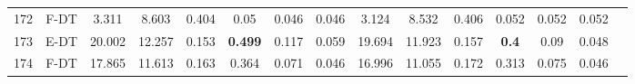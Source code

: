\begin{longtable}{@{\hskip3pt}c@{\hskip3pt}c@{\hskip3pt}c@{\hskip3pt}c@{\hskip3pt}c@{\hskip3pt}c@{\hskip3pt}c@{\hskip3pt}c@{\hskip3pt}c@{\hskip3pt}c@{\hskip3pt}c@{\hskip3pt}c@{\hskip3pt}c@{\hskip3pt}c@{\hskip3pt}c}
        172 &           F-DT &             3.311 &          8.603 &           0.404 &            0.05 &           0.046 &           0.046 &               3.124 &           8.532 &           0.406 &         0.052 &          0.052 &           0.052 \\
        173 &           E-DT &            20.002 &         12.257 &           0.153 &  \textbf{0.499} &           0.117 &           0.059 &              19.694 &          11.923 &           0.157 &  \textbf{0.4} &           0.09 &           0.048 \\
        174 &           F-DT &            17.865 &         11.613 &           0.163 &           0.364 &           0.071 &           0.046 &              16.996 &          11.055 &           0.172 &         0.313 &          0.075 &           0.046 \\
\end{longtable}
